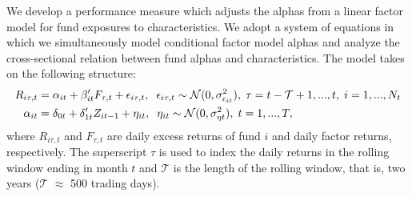 
We develop a performance measure which adjusts the alphas from a linear factor model for fund exposures to characteristics. We adopt a system of equations in which we simultaneously model conditional factor model alphas and analyze the cross-sectional relation between fund alphas and characteristics. The model takes on the following structure:   
\begin{alignat}{2}
    \label{asset}
    R_{i\tau,t} &= \alpha_{it} + \beta_{it}'F_{\tau,t} + \epsilon_{i\tau,t}, \hspace{0.2cm} \epsilon_{i\tau,t} \sim \mathcal{N}(0,\sigma^2_{\epsilon_{it}}), \hspace{0.1cm} \tau = t-\mathcal{T}+1,...,t,  
\hspace{0.1cm} i = 1,...,N_t \\
    \label{cross}
    \alpha_{it} &= \delta_{0t} + \delta_{1t}'Z_{it-1} + \eta_{it}, \hspace{0.2cm} \eta_{it} \sim \mathcal{N}(0,\sigma^2_{\eta t}), \hspace{0.1cm} t = 1,...,T,
\end{alignat}
where $R_{i\tau,t}$ and $F_{\tau,t}$ are daily excess returns of fund $i$ and daily factor returns, respectively. The superscript $\tau$ is used to index the daily returns in the rolling window ending in month $t$ and $\mathcal{T}$ is the length of the rolling window, that is, two years ($\mathcal{T}$ $\approx$ 500 trading days). 

